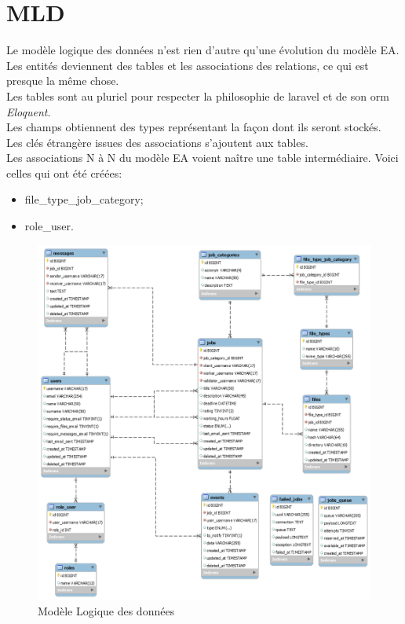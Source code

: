 \documentclass[
    iai, %
    il, %
]{heig-tb}
\begin{document}
\newpage

\section{MLD}
Le modèle logique des données n'est rien d'autre qu'une évolution du modèle EA.\\
Les entités deviennent des tables et les associations des relations, ce qui est presque la même chose.\\
Les tables sont au pluriel pour respecter la philosophie de \Gls{laravel} et de son \Gls{orm} \emph{Eloquent}.\\
Les champs obtiennent des types représentant la façon dont ils seront stockés.\\
Les clés étrangère issues des associations s'ajoutent aux tables.\\
Les associations N à N du modèle EA voient naître une table intermédiaire. Voici celles qui ont été créées:
\begin{itemize}
    \item file\_type\_job\_category;
    \item role\_user.
\end{itemize}

\begin{center}
    \begin{figure}[H]
        \includegraphics[width=\textwidth]{./assets/figures/mld.png}
        \caption{Modèle Logique des données \label{mld}}
    \end{figure}
\end{center}
\end{document}
